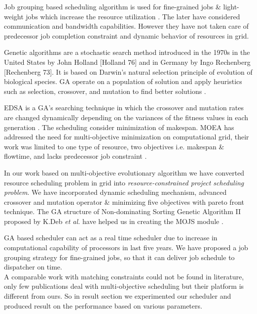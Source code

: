 Job grouping based scheduling algorithm is used for fine-grained jobs \& light-weight jobs which increase the resource utilization \cite{muthuvelu2005dynamic}  \cite{ang2009bandwidth} . The later have considered communication and bandwidth capabilities. However they have not taken care of predecessor job completion constraint and dynamic behavior of resources in grid.

Genetic algorithms are a stochastic search method introduced in the 1970s in the United States by John Holland [Holland 76] and in Germany by Ingo Rechenberg [Rechenberg 73]. It is based on Darwin's natural selection principle of evolution of biological species. GA operate on a population of solution and apply heuristics such as selection, crossover, and mutation to find better solutions \cite{wall1996genetic}. 

EDSA is a GA’s searching technique in which the crossover and mutation rates are changed dynamically depending on the variances of the fitness values in each generation \cite{yu2008evolution} . The scheduling consider minimization of makespan. 
MOEA  has addressed the need for multi-objective minimization on computational grid, their work was limited to one type of resource, two objectives i.e. makespan \& flowtime, and lacks predecessor job constraint \cite{grosan2007multiobjective}.

In our work based on multi-objective evolutionary algorithm we have converted resource scheduling problem in grid into \emph{resource-constrained project scheduling problem}. We have incorporated dynamic scheduling mechanism, advanced crossover and mutation operator \& minimizing five objectives with pareto front technique. The GA structure of Non-dominating Sorting Genetic Algorithm II proposed by K.Deb \emph{et al.} have helped us in creating the MOJS module \cite{deb2002fast}.

GA based scheduler can act as a real time scheduler due to increase in computational capability of processors in last five years.  We have proposed a job grouping strategy for fine-grained jobs, so that it can deliver job schedule to dispatcher on time. \\
A comparable work with matching constraints could not be found in literature, only few publications deal with multi-objective scheduling \cite{grosan2007multiobjective} but their platform is different from ours. So in result section we experimented our scheduler and produced result on the performance based on various parameters.\\
